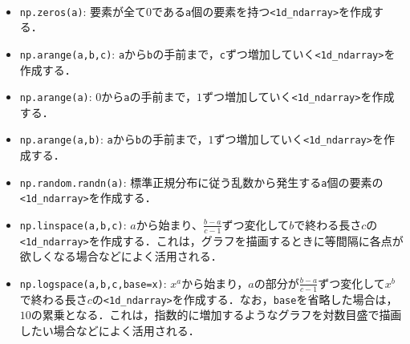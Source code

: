 \begin{gram}　
\begin{itemize}
\item \texttt{np.zeros(a)}: 要素が全て0である\texttt{a}個の要素を持つ\texttt{<1d\_ndarray>}を作成する．
\item \texttt{np.arange(a,b,c)}: \texttt{a}から\texttt{b}の手前まで，\texttt{c}ずつ増加していく\texttt{<1d\_ndarray>}を作成する．
\item \texttt{np.arange(a)}: $0$から\texttt{a}の手前まで，$1$ずつ増加していく\texttt{<1d\_ndarray>}を作成する．
\item \texttt{np.arange(a,b)}: \texttt{a}から\texttt{b}の手前まで，$1$ずつ増加していく\texttt{<1d\_ndarray>}を作成する．
\item \texttt{np.random.randn(a)}: 標準正規分布に従う乱数から発生する\texttt{a}個の要素の\texttt{<1d\_ndarray>}を作成する．
\item \texttt{np.linspace(a,b,c)}: $a$から始まり、$\frac{b-a}{c-1}$ずつ変化して$b$で終わる長さ$c$の\texttt{<1d\_ndarray>}を作成する．これは，グラフを描画するときに等間隔に各点が欲しくなる場合などによく活用される．
\item \texttt{np.logspace(a,b,c,base=x)}: $x^a$から始まり，$a$の部分が$\frac{b-a}{c-1}$ずつ変化して$x^b$で終わる長さ$c$の\texttt{<1d\_ndarray>}を作成する．なお，\texttt{base}を省略した場合は，$10$の累乗となる．これは，指数的に増加するようなグラフを対数目盛で描画したい場合などによく活用される．
\end{itemize}
\end{gram}

\begin{cod}[\texttt{num2.py}]　
}]{code/num2.py}
\vspace{-10pt}
\begin{lstlisting}
v=[0. 0. 0. 0. 0.]
w=[ 0  2  4  6  8 10 12 14 16 18 20 22 24 26 28]
x=[0 1 2 3 4 5 6 7 8 9]
y=[-10  -9  -8  -7  -6  -5  -4  -3  -2  -1   0]
z=[-0.38558831  1.20391439  1.18496279  1.50358118  0.93103295 -0.02233168
  0.04894498  0.20757944 -2.67874618 -1.90888007]
u=[-10.          -7.77777778  -5.55555556  -3.33333333  -1.11111111
   1.11111111   3.33333333   5.55555556   7.77777778  10.        ]
t=[1.000e+00 2.000e+00 4.000e+00 8.000e+00 1.600e+01 3.200e+01 6.400e+01
 1.280e+02 2.560e+02 5.120e+02 1.024e+03]
\end{lstlisting}
\end{cod}
\vspace{-10pt}

